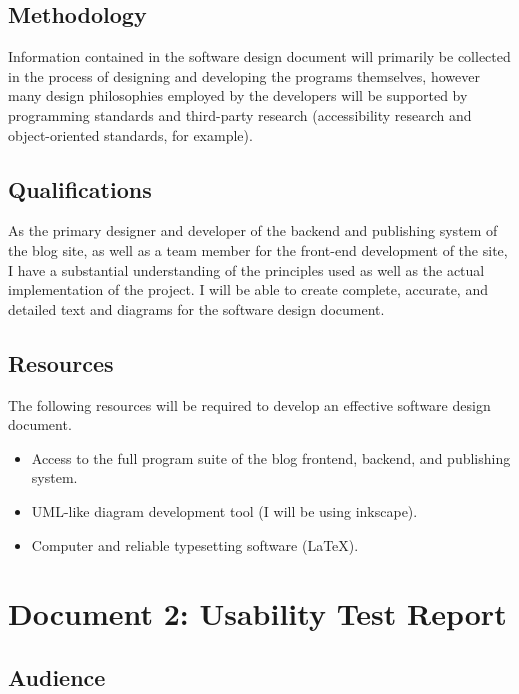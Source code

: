 \documentclass[12pt]{article}
\begin{document}
\subsection{Methodology}

Information contained in the software design document will primarily be collected in the process of designing and developing the programs themselves, however many design philosophies employed by the developers will be supported by programming standards and third-party research (accessibility research and object-oriented standards, for example).

\subsection{Qualifications}

As the primary designer and developer of the backend and publishing system of the blog site, as well as a team member for the front-end development of the site, I have a substantial understanding of the principles used as well as the actual implementation of the project. I will be able to create complete, accurate, and detailed text and diagrams for the software design document.

\subsection{Resources}

The following resources will be required to develop an effective software design document.

\begin{itemize}
	\item{Access to the full program suite of the blog frontend, backend, and publishing system.}
	\item{UML-like diagram development tool (I will be using inkscape).}
	\item{Computer and reliable typesetting software (\LaTeX).}
\end{itemize}


\newpage

\section{Document 2: Usability Test Report}

\subsection{Audience}
\end{document}

